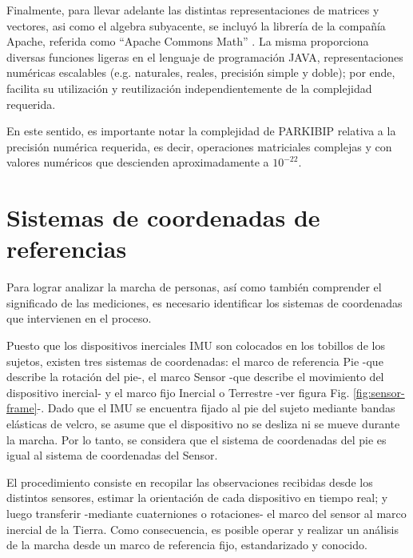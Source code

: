 Finalmente, para llevar adelante las distintas representaciones de matrices y vectores, asi como el algebra subyacente, se incluyó la librería de la compañía Apache, referida como ``Apache Commons Math'' \cite{apacheCommons}. La misma proporciona diversas funciones ligeras en el lenguaje de programación JAVA, representaciones numéricas escalables (e.g. naturales, reales, precisión simple y doble); por ende, facilita su utilización y reutilización independientemente de la complejidad requerida. 

En este sentido, es importante notar la complejidad de PARKIBIP relativa a la precisión numérica requerida, es decir, operaciones matriciales complejas y con valores numéricos que descienden aproximadamente a $10^{-22}$.

\section{Sistemas de coordenadas de referencias } \label{section:coordenadas}

Para lograr analizar la marcha de personas, así como también comprender el significado de las mediciones, es necesario identificar los sistemas de coordenadas que intervienen en el proceso.

Puesto que los dispositivos inerciales IMU son colocados en los tobillos de los sujetos, existen tres sistemas de coordenadas: el marco de referencia Pie -que describe la rotación del pie-, el marco Sensor -que describe el movimiento del dispositivo inercial- y el marco fijo Inercial o Terrestre -ver figura Fig. \ref{fig:sensor-frame}-. Dado que el IMU se encuentra fijado al pie del sujeto mediante bandas elásticas de velcro, se asume que el dispositivo no se desliza ni se mueve durante la marcha. Por lo tanto, se considera que el sistema de coordenadas del pie es igual al sistema de coordenadas del Sensor.

El procedimiento consiste en recopilar las observaciones recibidas desde los distintos sensores, estimar la orientación de cada dispositivo en tiempo real; y luego transferir -mediante cuaterniones o rotaciones- el marco del sensor al marco inercial de la Tierra. Como consecuencia, es posible operar y realizar un análisis de la marcha desde un marco de referencia fijo, estandarizado y conocido.

\newpage

